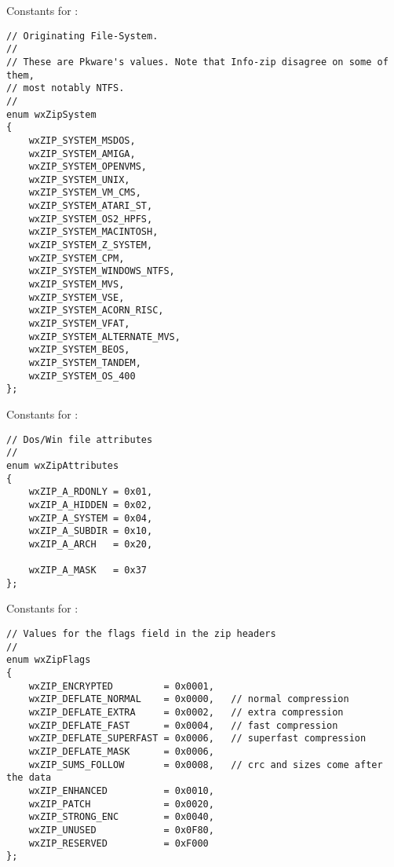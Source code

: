 Constants for :

\begin{verbatim}
// Originating File-System.
// 
// These are Pkware's values. Note that Info-zip disagree on some of them,
// most notably NTFS.
//
enum wxZipSystem
{
    wxZIP_SYSTEM_MSDOS,
    wxZIP_SYSTEM_AMIGA,
    wxZIP_SYSTEM_OPENVMS,
    wxZIP_SYSTEM_UNIX,
    wxZIP_SYSTEM_VM_CMS,
    wxZIP_SYSTEM_ATARI_ST,
    wxZIP_SYSTEM_OS2_HPFS,
    wxZIP_SYSTEM_MACINTOSH,
    wxZIP_SYSTEM_Z_SYSTEM,
    wxZIP_SYSTEM_CPM,
    wxZIP_SYSTEM_WINDOWS_NTFS,
    wxZIP_SYSTEM_MVS,
    wxZIP_SYSTEM_VSE,
    wxZIP_SYSTEM_ACORN_RISC,
    wxZIP_SYSTEM_VFAT,
    wxZIP_SYSTEM_ALTERNATE_MVS,
    wxZIP_SYSTEM_BEOS,
    wxZIP_SYSTEM_TANDEM,
    wxZIP_SYSTEM_OS_400
};

\end{verbatim}

Constants for :

\begin{verbatim}
// Dos/Win file attributes
//
enum wxZipAttributes
{
    wxZIP_A_RDONLY = 0x01,
    wxZIP_A_HIDDEN = 0x02,
    wxZIP_A_SYSTEM = 0x04,
    wxZIP_A_SUBDIR = 0x10,
    wxZIP_A_ARCH   = 0x20,

    wxZIP_A_MASK   = 0x37
};

\end{verbatim}

Constants for :

\begin{verbatim}
// Values for the flags field in the zip headers
//
enum wxZipFlags
{
    wxZIP_ENCRYPTED         = 0x0001,
    wxZIP_DEFLATE_NORMAL    = 0x0000,   // normal compression
    wxZIP_DEFLATE_EXTRA     = 0x0002,   // extra compression
    wxZIP_DEFLATE_FAST      = 0x0004,   // fast compression
    wxZIP_DEFLATE_SUPERFAST = 0x0006,   // superfast compression
    wxZIP_DEFLATE_MASK      = 0x0006,
    wxZIP_SUMS_FOLLOW       = 0x0008,   // crc and sizes come after the data
    wxZIP_ENHANCED          = 0x0010,
    wxZIP_PATCH             = 0x0020,
    wxZIP_STRONG_ENC        = 0x0040,
    wxZIP_UNUSED            = 0x0F80,
    wxZIP_RESERVED          = 0xF000
};

\end{verbatim}


\\
\\
\\

